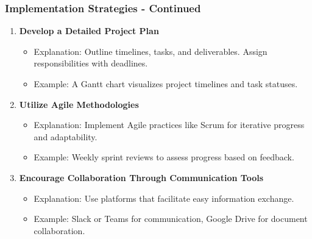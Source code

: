 \documentclass[aspectratio=169]{beamer}
\begin{document}
\begin{frame}[fragile]
    \frametitle{Implementation Strategies - Continued}
    \begin{enumerate}[resume]
        \item \textbf{Develop a Detailed Project Plan}
            \begin{itemize}
                \item Explanation: Outline timelines, tasks, and deliverables. Assign responsibilities with deadlines.
                \item Example: A Gantt chart visualizes project timelines and task statuses.
            \end{itemize}
        
        \item \textbf{Utilize Agile Methodologies}
            \begin{itemize}
                \item Explanation: Implement Agile practices like Scrum for iterative progress and adaptability.
                \item Example: Weekly sprint reviews to assess progress based on feedback.
            \end{itemize}

        \item \textbf{Encourage Collaboration Through Communication Tools}
            \begin{itemize}
                \item Explanation: Use platforms that facilitate easy information exchange.
                \item Example: Slack or Teams for communication, Google Drive for document collaboration.
            \end{itemize}
    \end{enumerate}
\end{frame}
\end{document}
